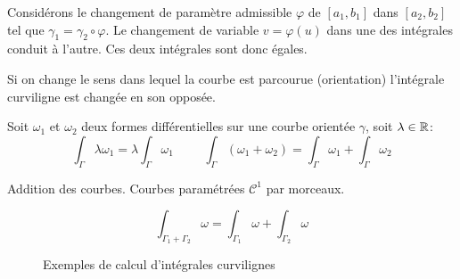 \begin{demo}
 Considérons le changement de paramètre admissible $\varphi$ de $[a_1,b_1]$ dans $[a_2,b_2]$ tel que $\gamma_1 = \gamma_2 \circ \varphi$. Le changement de variable $v=\varphi(u)$ dans une des intégrales conduit à l'autre. Ces deux intégrales sont donc égales. 
\end{demo}
\begin{rem}
 Si on change le sens dans lequel la courbe est parcourue (orientation) l'intégrale curviligne est changée en son opposée.
\end{rem}
\begin{prop}[Linéarité]
 Soit $\omega_1$ et $\omega_2$ deux formes différentielles sur une courbe orientée $\gamma$, soit $\lambda\in \mathbb{R}$:
\begin{displaymath}
 \int_\Gamma \lambda \omega_1 = \lambda \int_\Gamma \omega_1
\hspace{1cm}
\int_\Gamma (\omega_1 + \omega_2) = \int_\Gamma \omega_1 + \int_\Gamma \omega_2
\end{displaymath}
\end{prop}
Addition des courbes. Courbes paramétrées $\mathcal C^1$ par morceaux.
\begin{prop}
 \begin{displaymath}
 \int_{\Gamma_1 + \Gamma_2} \omega = \int_{\Gamma_1} \omega+ \int_{\Gamma_2} \omega 
\end{displaymath}
\end{prop}

\begin{figure}[h!t]
  \centering
   \hspace{2cm}
  \caption{Exemples de calcul d'intégrales curvilignes}
  \label{fig:C2269_3_4}
\end{figure}

